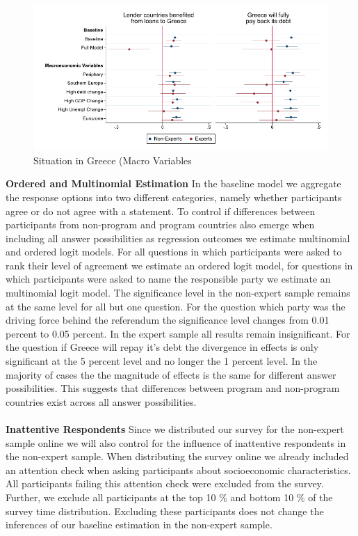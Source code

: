 \begin{figure}[h!]
    \begin{center}
     \caption{Situation in Greece (Macro Variables}
    \includegraphics[scale=1.2]{macro_S_1601_S_1701.pdf}
    \end{center}
    \tiny
\end{figure}
    \clearpage
\textbf{Ordered and Multinomial Estimation}
In the baseline model we aggregate the response options into two different categories, namely whether participants agree or do not agree with a statement.  To control if differences between participants from non-program and program countries also emerge when including all answer possibilities as regression outcomes we estimate multinomial and ordered logit models. For all questions in which participants were asked to rank their level of agreement we estimate an ordered logit model, for questions in which participants were asked to name the responsible party we estimate an multinomial logit model. The significance level in the non-expert sample remains at the same level for all but one question. For the question which party was the driving force behind the referendum the significance level changes from 0.01 percent to 0.05 percent. In the expert sample all results remain insignificant. For the question if Greece will repay it's debt the divergence in effects is only significant at the 5 percent level and no longer the 1 percent level. In the majority of cases the the magnitude of effects is the same for different answer possibilities. This suggests that differences between program and non-program countries exist across all answer possibilities. \\

\\
\textbf{Inattentive Respondents}
Since we distributed our survey for the non-expert sample online we will also control for the influence of inattentive respondents in the non-expert sample. When distributing the survey online we already included an attention check when asking participants about socioeconomic characteristics. All participants failing this attention check were excluded from the survey. Further, we exclude all participants at the top 10 $\%$ and bottom 10 $\%$ of the survey time distribution. Excluding these participants does not change the inferences of our baseline estimation in the non-expert sample.\\


